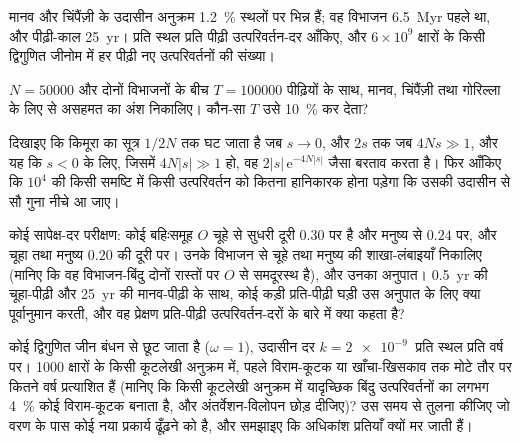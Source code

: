 \begin{exercise}[$\star\star$]\label{exo:b3:molecular-evolution:8}
मानव और चिंपैंज़ी के उदासीन अनुक्रम \qty{1.2}{\%} स्थलों पर भिन्न हैं;
वह विभाजन \qty{6.5}{Myr} पहले था, और पीढ़ी-काल \qty{25}{yr}। प्रति स्थल
प्रति पीढ़ी उत्परिवर्तन-दर आँकिए, और $6\times 10^{9}$ क्षारों के किसी
द्विगुणित जीनोम में हर पीढ़ी नए उत्परिवर्तनों की संख्या।
\end{exercise}

\begin{exercise}[$\star\star$]\label{exo:b3:molecular-evolution:9}
$N = \num{50000}$ और दोनों विभाजनों के बीच $T = \num{100000}$ पीढ़ियों
के साथ, मानव, चिंपैंज़ी तथा गोरिल्ला के लिए  से असहमत
 का अंश निकालिए। कौन-सा $T$ उसे \qty{10}{\%} कर देता?
\end{exercise}

\begin{exercise}[$\star\star\star$]\label{exo:b3:molecular-evolution:10}
दिखाइए कि किमूरा का सूत्र $1/2N$ तक घट जाता है जब $s \to 0$, और
$2s$ तक जब $4Ns \gg 1$, और यह कि $s < 0$ के लिए, जिसमें $4N|s| \gg 1$ हो, वह
$2|s|\,\mathrm{e}^{-4N|s|}$ जैसा बरताव करता है। फिर आँकिए कि $10^{4}$ की
किसी समष्टि में किसी उत्परिवर्तन को कितना हानिकारक होना पड़ेगा कि उसकी
 उदासीन से सौ गुना नीचे आ जाए।
\end{exercise}

\begin{exercise}[$\star\star\star$]\label{exo:b3:molecular-evolution:11}
कोई सापेक्ष-दर परीक्षण: कोई बहिःसमूह $O$ चूहे से सुधरी दूरी $0.30$ पर
है और मनुष्य से $0.24$ पर, और चूहा तथा मनुष्य $0.20$ की दूरी पर। उनके
विभाजन से चूहे तथा मनुष्य की शाखा-लंबाइयाँ निकालिए (मानिए कि वह
विभाजन-बिंदु दोनों रास्तों पर $O$ से समदूरस्थ है), और उनका अनुपात।
\qty{0.5}{yr} की चूहा-पीढ़ी और \qty{25}{yr} की मानव-पीढ़ी के साथ, कोई
कड़ी प्रति-पीढ़ी घड़ी उस अनुपात के लिए क्या पूर्वानुमान करती, और वह
प्रेक्षण प्रति-पीढ़ी उत्परिवर्तन-दरों के बारे में क्या कहता है?
\end{exercise}

\begin{exercise}[$\star\star\star$]\label{exo:b3:molecular-evolution:12}
कोई द्विगुणित जीन बंधन से छूट जाता है ($\omega = 1$), उदासीन दर
$k = \qty{2e-9}{}$ प्रति स्थल प्रति वर्ष पर। 1000 क्षारों के किसी कूटलेखी
अनुक्रम में, पहले विराम-कूटक या खाँचा-खिसकाव तक मोटे तौर पर कितने वर्ष
प्रत्याशित हैं (मानिए कि किसी कूटलेखी अनुक्रम में यादृच्छिक बिंदु
उत्परिवर्तनों का लगभग \qty{4}{\%} कोई विराम-कूटक बनाता है, और
अंतर्वेशन-विलोपन छोड़ दीजिए)? उस समय से तुलना कीजिए जो वरण के पास कोई
नया प्रकार्य ढूँढ़ने को है, और समझाइए कि अधिकांश प्रतियाँ क्यों मर जाती हैं।
\end{exercise}

